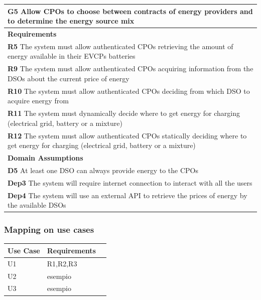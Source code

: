 \begin{table}[H]
    \begin{tabularx}{\textwidth}{X}
        \toprule
        \textbf{G5} Allow CPOs to choose between contracts of energy providers and to determine the energy source mix                                      \\ \midrule
        \textbf{Requirements}                                                                                                                              \\ \midrule
        \textbf{R5}  The system must allow authenticated CPOs retrieving the amount of energy available in their EVCPs batteries                           \\
        \textbf{R9}  The system must allow authenticated CPOs acquiring information from the DSOs about the current price of energy                        \\
        \textbf{R10}  The system must allow authenticated CPOs deciding from which DSO to acquire energy from                                              \\
        \textbf{R11} The system must dynamically decide where to get energy for charging (electrical grid, battery or a mixture)                           \\
        \textbf{R12} The system must allow authenticated CPOs statically deciding where to get energy for charging (electrical grid, battery or a mixture) \\  \midrule
        \textbf{Domain Assumptions}                                                                                                                        \\ \midrule
        \textbf{D5}   At least one DSO can always provide energy to the CPOs                                                                               \\
        \textbf{Dep3} The system will require internet connection to interact with all the users                                                           \\
        \textbf{Dep4} The system will use an external API to retrieve the prices of energy by the available DSOs                                           \\  \bottomrule
    \end{tabularx}
\end{table}
\subsubsection{Mapping on use cases}
\begin{table}[H]
    \begin{tabularx}{\textwidth}{XXX}
        \toprule
        \textbf{Use Case} & \textbf{Requirements} \\ \midrule
        U1                & R1,R2,R3              \\
        U2                & esempio               \\
        U3                & esempio               \\ \bottomrule
    \end{tabularx}
\end{table}


